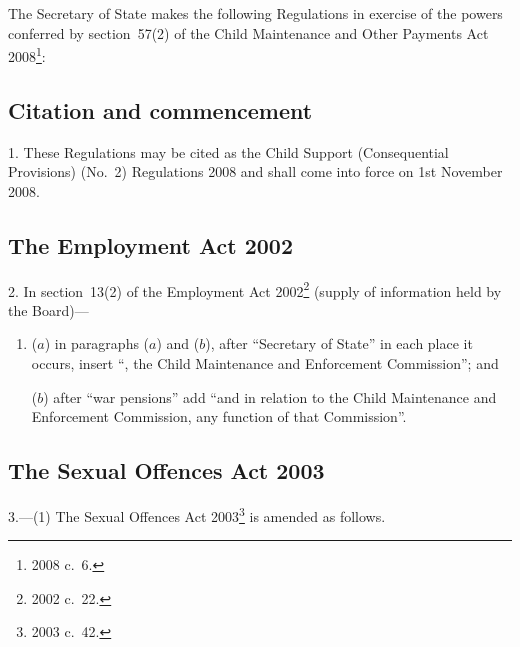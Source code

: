 \documentclass[12pt,a4paper]{article}
\title{\regstitle}
\author{S.I.\ 2008 No.\ 2656}
\date{Made
7th October 2008\\
Laid before Parliament
10th October 2008\\
Coming into~force
1st November 2008
}
\begin{document}
\maketitle

\noindent
The Secretary of State makes the following Regulations in exercise of the powers conferred by section~57(2) of the Child Maintenance and Other Payments Act 2008\footnote{2008 c.~6.}: 

{\sloppy

\tableofcontents

}

\bigskip

\setcounter{secnumdepth}{-2}

\subsection[1. Citation and commencement]{Citation and commencement}

1.  These Regulations may be cited as the Child Support (Consequential Provisions) (No.~2) Regulations 2008 and shall come into force on 1st November 2008.

\subsection[2. The Employment Act 2002]{The Employment Act 2002}

2.  In section~13(2) of the Employment Act 2002\footnote{2002 c.~22.} (supply of information held by the Board)—
\begin{enumerate}\item[]
($a$) in paragraphs ($a$)  and ($b$), after “Secretary of State” in each place it occurs, insert “, the Child Maintenance and Enforcement Commission”; and

($b$) after “war pensions” add “and in relation to the Child Maintenance and Enforcement Commission, any function of that Commission”.
\end{enumerate}

\subsection[3. The Sexual Offences Act 2003]{The Sexual Offences Act 2003}

3.---(1)  The Sexual Offences Act 2003\footnote{2003 c.~42.} is amended as follows.
\end{document}
